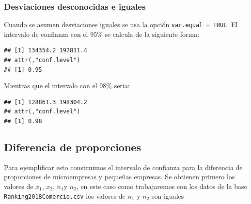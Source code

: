\documentclass[letterpaper,]{book}
\newenvironment{Shaded}{\begin{snugshade}}{\end{snugshade}}
\newcommand{\DataTypeTok}[1]{\textcolor[rgb]{0.13,0.29,0.53}{#1}}
\newcommand{\FloatTok}[1]{\textcolor[rgb]{0.00,0.00,0.81}{#1}}
\newcommand{\KeywordTok}[1]{\textcolor[rgb]{0.13,0.29,0.53}{\textbf{#1}}}
\newcommand{\NormalTok}[1]{#1}
\newcommand{\OperatorTok}[1]{\textcolor[rgb]{0.81,0.36,0.00}{\textbf{#1}}}
\newcommand{\OtherTok}[1]{\textcolor[rgb]{0.56,0.35,0.01}{#1}}
\begin{document}
\hypertarget{desviaciones-desconocidas-e-iguales-1}{%
\subsubsection{Desviaciones desconocidas e iguales}\label{desviaciones-desconocidas-e-iguales-1}}

Cuando se asumen desviaciones iguales se usa la opción \texttt{var.equal\ =\ TRUE}. El intervalo de confianza con el \(95\)\% se calcula de la siguiente forma:

\begin{Shaded}
\end{Shaded}

\begin{verbatim}
## [1] 134354.2 192811.4
## attr(,"conf.level")
## [1] 0.95
\end{verbatim}

Mientras que el intervalo con el \(98\)\% seria:

\begin{Shaded}
\end{Shaded}

\begin{verbatim}
## [1] 128861.3 198304.2
## attr(,"conf.level")
## [1] 0.98
\end{verbatim}

\hypertarget{diferencia-de-proporciones}{%
\subsection{Diferencia de proporciones}\label{diferencia-de-proporciones}}

Para ejemplificar esto construimos el intervalo de confianza para la diferencia de proporciones de microempresas y pequeñas empresas. Se obtienen primero los valores de \(x_1\), \(x_2\), \(n_1\)y \(n_2\), en este caso como trabajaremos con los datos de la base \texttt{Ranking2018Comercio.csv} los valores de \(n_1\) y \(n_2\) son iguales
\end{document}
